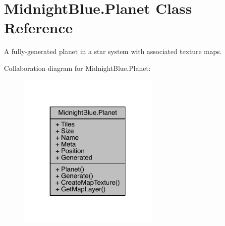 \hypertarget{class_midnight_blue_1_1_planet}{}\section{Midnight\+Blue.\+Planet Class Reference}
\label{class_midnight_blue_1_1_planet}


A fully-\/generated planet in a star system with associated texture maps.  




Collaboration diagram for Midnight\+Blue.\+Planet\+:
\nopagebreak
\begin{figure}[H]
\begin{center}
\leavevmode
\includegraphics[width=194pt]{class_midnight_blue_1_1_planet__coll__graph}
\end{center}
\end{figure}
